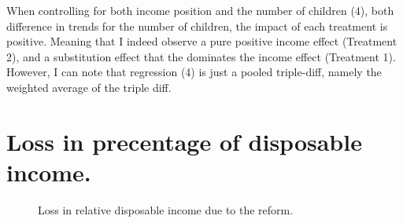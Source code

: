 \begin{subappendices}
When controlling for both income position and the number of children (4), both difference in trends for the number of children, the impact of each treatment is positive. Meaning that I indeed observe a pure positive income effect (Treatment 2), and a substitution effect that the dominates the income effect (Treatment 1). However, I can note that regression (4) is just a pooled triple-diff, namely the weighted average of the triple diff. 

\section{Loss in precentage of disposable income.}  
 \begin{figure}[H]
    \caption{Loss in relative disposable income due to the reform.}
 \label{fig:percent_loss}
\end{figure}


\end{subappendices}
